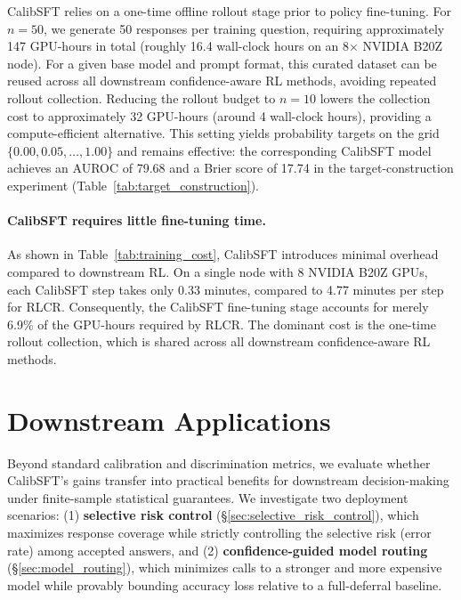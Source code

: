 \documentclass{article} %
\begin{document}
CalibSFT relies on a one-time offline rollout stage prior to policy fine-tuning. 
For $n=50$, we generate 50 responses per training question, requiring approximately 147 GPU-hours in total (roughly 16.4 wall-clock hours on an 8$\times$ NVIDIA B20Z node).
For a given base model and prompt format, this curated dataset can be reused across all downstream confidence-aware RL methods, avoiding repeated rollout collection. 
Reducing the rollout budget to $n=10$ lowers the collection cost to approximately 32 GPU-hours (around 4 wall-clock hours), providing a compute-efficient alternative.
This setting yields probability targets on the grid
$\{0.00,0.05,\ldots,1.00\}$ and remains effective: the corresponding
CalibSFT model achieves an AUROC of 79.68 and a Brier score of 17.74 in
the target-construction experiment (Table~\ref{tab:target_construction}).

\paragraph{CalibSFT requires little fine-tuning time.}
As shown in Table~\ref{tab:training_cost}, 
CalibSFT introduces minimal overhead compared to downstream RL. 
On a single node with 8 NVIDIA B20Z GPUs, each CalibSFT step takes only 0.33 minutes, compared to 4.77 minutes per step for RLCR. 
Consequently, the CalibSFT fine-tuning stage accounts for merely 6.9\% of the GPU-hours required by RLCR. The dominant cost is the one-time rollout collection, which is shared across all downstream confidence-aware RL methods.




\section{Downstream Applications}


Beyond standard calibration and discrimination metrics, 
we evaluate whether CalibSFT's gains 
transfer into practical benefits for downstream decision-making under finite-sample statistical guarantees.
We investigate two deployment scenarios:
(1) \textbf{selective risk control} (\S\ref{sec:selective_risk_control}), 
which maximizes response coverage while strictly controlling the selective risk (error rate) 
among accepted answers, and
(2) \textbf{confidence-guided model routing} (\S\ref{sec:model_routing}), 
which minimizes calls to a stronger and more expensive model 
while provably bounding accuracy loss relative to a full-deferral baseline.
\end{document}
